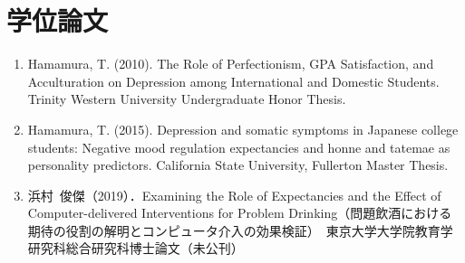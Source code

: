 \documentclass{article}
\begin{document}
\section{学位論文}
	\begin{enumerate}
		\item Hamamura, T.  (2010). The Role of Perfectionism, GPA Satisfaction, and Acculturation on Depression among International and Domestic Students. Trinity Western University Undergraduate Honor Thesis.
		\item Hamamura, T. (2015). Depression and somatic symptoms in Japanese college students: Negative mood regulation expectancies and honne and tatemae as personality predictors. California State University, Fullerton Master Thesis.
		\item 浜村\ 俊傑（2019）．Examining the Role of Expectancies and the Effect of Computer-delivered Interventions for Problem Drinking（問題飲酒における期待の役割の解明とコンピュータ介入の効果検証）　東京大学大学院教育学研究科総合研究科博士論文（未公刊）
	\end{enumerate}
\end{document}

